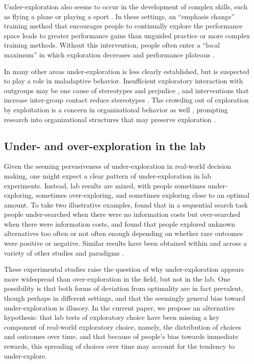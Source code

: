 \documentclass[10pt,letterpaper]{article}
\begin{document}
Under-exploration also seems to occur in the development of complex skills, such
as flying a plane or playing a sport \citep{Gopher1989}. In these settings, an ``emphasis
change'' training method that encourages people to continually explore the
performance space leads to greater performance gains than unguided practice or more complex
training methods.  Without this intervention, people often enter a ``local
maximum'' in which exploration decreases and performance plateaus \citep{Yechiam2001}.

In many other areas under-exploration is less clearly
established, but is suspected to play a role in maladaptive behavior.
Insufficient exploratory interaction with outgroups may be one cause of
stereotypes and prejudice \citep{Denrell2005most}, and interventions that
increase inter-group contact reduce stereotypes \citep{Shook2008}. The crowding
out of exploration by exploitation is a concern in organizational behavior as
well \citep{March1991, Levinthal1993}, prompting research into organizational
structures that may preserve exploration \citep{Fang2010}.

\subsection{Under- and over-exploration in the lab}

Given the seeming pervasiveness of under-exploration in real-world decision
making, one might expect a clear pattern of under-exploration in lab
experiments. Instead, lab results are mixed, with people sometimes
under-exploring, sometimes over-exploring, and sometimes exploring close to an
optimal amount. To take two illustrative examples, \citet{Zwick2003} found that
in a sequential search task people under-searched when there were no information
costs but over-searched when there were information costs, and
\citet{Teodorescu2014} found that people explored unknown alternatives too often
or not often enough depending on whether rare outcomes were positive or
negative. Similar results have been obtained within and across a variety of
other studies and paradigms
\citep{tversky1966information, hertwig2004decisions, Navarro2016, Juni2016, Sang2011}.

These experimental studies raise the question of why under-exploration appears
more widespread than over-exploration in the field, but not in the lab. One
possibility is that both forms of deviation from optimality are in fact
prevalent, though perhaps in different settings, and that the seemingly general bias
toward under-exploration is illusory. In the current paper, we propose an
alternative hypothesis: that lab tests of exploratory choice have been missing a key component
of real-world exploratory choice, namely, the distribution of choices and
outcomes over time, and that because of people's bias towards immediate rewards,
this spreading of choices over time may account for the tendency to under-explore.
\end{document}
